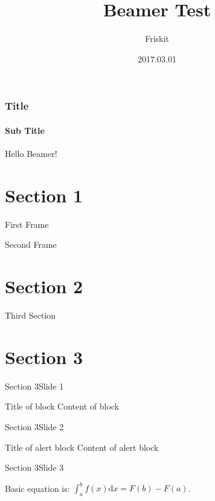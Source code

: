\documentclass{beamer}
\begin{document}
	\title{Beamer Test}
	\author{Friskit}
	\date{2017.03.01}
	\begin{frame}[plain]
		\titlepage
	\end{frame}
	
	\begin{frame}
		\frametitle{Title}
		\framesubtitle{Sub Title}
		Hello Beamer!
	\end{frame}
	
	\begin{frame}
		\tableofcontents[hideallsubsections]
	\end{frame}
	

	\section{Section 1}
	\begin{frame}
		First Frame
	\end{frame}
	\begin{frame}
		Second Frame
	\end{frame}
	
	\section{Section 2}
	\begin{frame}
		Third Section
	\end{frame}
	
	\section{Section 3}
	\begin{frame}{Section 3}{Slide 1}
		\begin{block}{Title of block}
			Content of block
		\end{block}
	\end{frame}
	
	\begin{frame}{Section 3}{Slide 2}
		\begin{alertblock}{Title of alert block}
			Content of alert block
		\end{alertblock}
	\end{frame}
	
	\begin{frame}{Section 3}{Slide 3}
		\begin{theorem}
			Basic equation is: $\int_{a}^{b} f(x)\mathrm{d}x=F(b)-F(a)$.
		\end{theorem}
	\end{frame}
	
\end{document}
